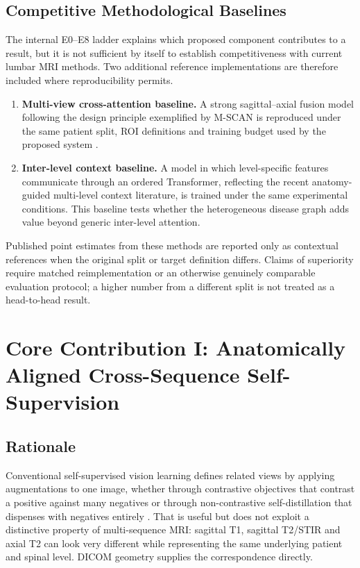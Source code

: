 \subsection{Competitive Methodological Baselines}
\label{sec:method-competitive-baselines}

The internal E0--E8 ladder explains which proposed component contributes to a
result, but it is not sufficient by itself to establish competitiveness with
current lumbar MRI methods. Two additional reference implementations are
therefore included where reproducibility permits.

\begin{enumerate}
  \item \textbf{Multi-view cross-attention baseline.} A strong sagittal--axial
  fusion model following the design principle exemplified by M-SCAN is
  reproduced under the same patient split, ROI definitions and training budget
  used by the proposed system \cite{batra2025mscan}.
  \item \textbf{Inter-level context baseline.} A model in which level-specific
  features communicate through an ordered Transformer, reflecting the recent
  anatomy-guided multi-level context literature, is trained under the same
  experimental conditions. This baseline tests whether the heterogeneous
  disease graph adds value beyond generic inter-level attention.
\end{enumerate}

Published point estimates from these methods are reported only as contextual
references when the original split or target definition differs. Claims of
superiority require matched reimplementation or an otherwise genuinely
comparable evaluation protocol; a higher number from a different split is not
treated as a head-to-head result.

\section{Core Contribution I: Anatomically Aligned Cross-Sequence Self-Supervision}
\label{sec:method-ssl}

\subsection{Rationale}
\label{sec:method-ssl-rationale}

Conventional self-supervised vision learning defines related views by applying
augmentations to one image, whether through contrastive objectives that
contrast a positive against many negatives
\cite{chen2020simple,he2020momentum} or through non-contrastive
self-distillation that dispenses with negatives entirely
\cite{grill2020bootstrap,caron2021emerging}. That is useful but does not
exploit a distinctive property of multi-sequence MRI: sagittal T1, sagittal
T2/STIR and axial T2 can look very different while representing the same
underlying patient and spinal level. DICOM geometry supplies the correspondence
directly.


